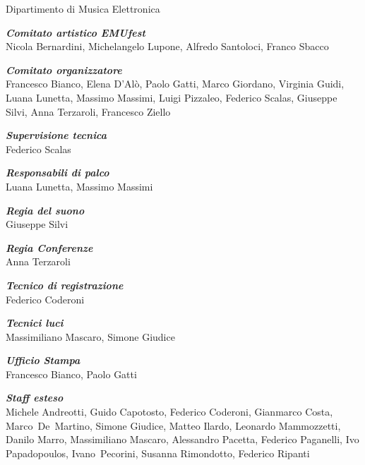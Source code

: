 \documentclass[8pt, twoside, a5paper]{extreport}
\begin{document}

\begin{center}

{\fontsize{30}{30} }
\medskip

{\fontsize{12}{12} \textsf{Dipartimento di Musica Elettronica}}\\
\vspace{.5cm}

\textbf{\textit{Comitato artistico EMUfest}}\\
Nicola Bernardini, Michelangelo Lupone, Alfredo Santoloci, Franco Sbacco
\medskip

\textbf{\textit{Comitato organizzatore}}\\
Francesco Bianco, Elena D'Alò, Paolo Gatti, Marco Giordano, Virginia Guidi, Luana Lunetta, Massimo Massimi, 	Luigi Pizzaleo, Federico Scalas, Giuseppe Silvi, Anna Terzaroli, Francesco Ziello
\medskip

\textbf{\textit{Supervisione tecnica}}\\
Federico Scalas
\medskip

\textbf{\textit{Responsabili di palco}}\\
Luana Lunetta, Massimo Massimi
\medskip

\textbf{\textit{Regia del suono}}\\
Giuseppe Silvi
\medskip

\textbf{\textit{Regia Conferenze}}\\
Anna Terzaroli
\medskip

\textbf{\textit{Tecnico di registrazione}}\\
Federico Coderoni
\medskip

\textbf{\textit{Tecnici luci}}\\
Massimiliano Mascaro, Simone Giudice
\medskip

\textbf{\textit{Ufficio Stampa}}\\
Francesco Bianco, Paolo Gatti
\medskip

\textbf{\textit{Staff esteso}}\\
Michele Andreotti, Guido Capotosto, Federico Coderoni, Gianmarco Costa,
Marco~De~Martino, Simone Giudice, Matteo Ilardo, Leonardo Mammozzetti,
Danilo Marro, Massimiliano Mascaro, Alessandro Pacetta,
Federico Paganelli, Ivo Papadopoulos, Ivano~Pecorini, Susanna Rimondotto, Federico Ripanti
\end{center}


\end{document}
